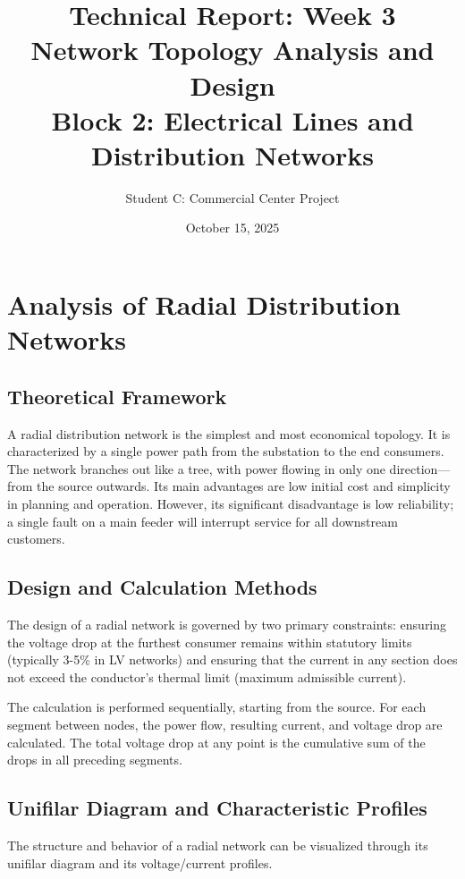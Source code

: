 \documentclass[12pt, a4paper]{article}
\title{
    \vspace{2cm}
    \textbf{Technical Report: Week 3 \\ Network Topology Analysis and Design} \\
    \large{Block 2: Electrical Lines and Distribution Networks}
    \vspace{3cm}
}
\author{Student C: Commercial Center Project}
\date{October 15, 2025}
\begin{document}
\begin{titlepage}
    \maketitle
\end{titlepage}
\thispagestyle{empty}

\newpage
\tableofcontents
\thispagestyle{empty}
\newpage

\pagestyle{fancy} %

\section{Analysis of Radial Distribution Networks}
\subsection{Theoretical Framework}
A radial distribution network is the simplest and most economical topology. It is characterized by a single power path from the substation to the end consumers. The network branches out like a tree, with power flowing in only one direction—from the source outwards. Its main advantages are low initial cost and simplicity in planning and operation. However, its significant disadvantage is low reliability; a single fault on a main feeder will interrupt service for all downstream customers.

\subsection{Design and Calculation Methods}
The design of a radial network is governed by two primary constraints: ensuring the voltage drop at the furthest consumer remains within statutory limits (typically 3-5\% in LV networks) and ensuring that the current in any section does not exceed the conductor's thermal limit (maximum admissible current).

The calculation is performed sequentially, starting from the source. For each segment between nodes, the power flow, resulting current, and voltage drop are calculated. The total voltage drop at any point is the cumulative sum of the drops in all preceding segments.

\subsection{Unifilar Diagram and Characteristic Profiles}
The structure and behavior of a radial network can be visualized through its unifilar diagram and its voltage/current profiles.
\end{document}
